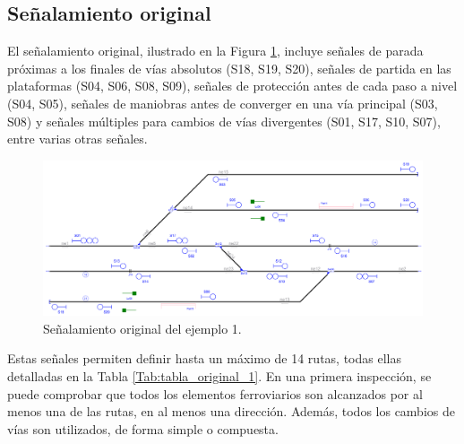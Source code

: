 \subsection{Señalamiento original}

    El señalamiento original, ilustrado en la Figura \ref{fig:EJ1_2}, incluye señales de parada próximas a los finales de vías absolutos (S18, S19, S20), señales de partida en las plataformas (S04, S06, S08, S09), señales de protección antes de cada paso a nivel (S04, S05), señales de maniobras antes de converger en una vía principal (S03, S08) y señales múltiples para cambios de vías divergentes (S01, S17, S10, S07), entre varias otras señales.
    
    \begin{figure}[H]
    	\centering
    	\includegraphics[width=1\textwidth]{resultados-obtenidos/ejemplo1/images/1_original.png}
    	\centering\caption{Señalamiento original del ejemplo 1.}
    	\label{fig:EJ1_2}
    \end{figure}
    
    Estas señales permiten definir hasta un máximo de 14 rutas, todas ellas detalladas en la Tabla \ref{Tab:tabla_original_1}. En una primera inspección, se puede comprobar que todos los elementos ferroviarios son alcanzados por al menos una de las rutas, en al menos una dirección. Además, todos los cambios de vías son utilizados, de forma simple o compuesta. 
    
